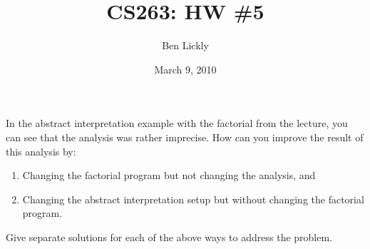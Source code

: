 \documentclass{article}
\title{CS263: HW \#5}
\author{Ben Lickly}
\date{March 9, 2010}
\newcommand{\problem}[1]
{\subsubsection*{} %
\vspace{-16pt} \section{} \vspace{-22pt} \qquad
#1%
\bigskip \bigskip
}
\begin{document}
\maketitle

\problem{In the abstract interpretation example with the factorial from
the lecture, you can see that the analysis was rather imprecise. How can you
improve the result of this analysis by:
\begin{enumerate}
  \item Changing the factorial program but not changing the analysis, and
  \item Changing the abstract interpretation setup but without changing the
factorial program.
\end{enumerate}
Give separate solutions for each of the above ways to address the problem.
}
\end{document}
